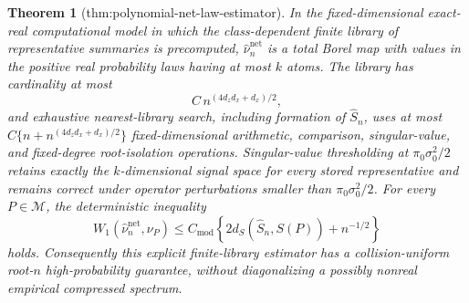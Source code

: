 \documentclass{article}
\newtheorem{theorem}{Theorem}
\begin{document}
\begin{theorem}[thm:polynomial-net-law-estimator]\label{thm:polynomial-net-law-estimator}
In the fixed-dimensional exact-real computational model in which the class-dependent finite library of representative summaries is precomputed, \(\widehat\nu_n^{\mathrm{net}}\) is a total Borel map with values in the positive real probability laws having at most \(k\) atoms.  The library has cardinality at most
\[
C\,n^{(4d_zd_x+d_x)/2},
\]
and exhaustive nearest-library search, including formation of \(\widehat S_n\), uses at most \(C\{n+n^{(4d_zd_x+d_x)/2}\}\) fixed-dimensional arithmetic, comparison, singular-value, and fixed-degree root-isolation operations.  Singular-value thresholding at \(\pi_0\sigma_0^2/2\) retains exactly the \(k\)-dimensional signal space for every stored representative and remains correct under operator perturbations smaller than \(\pi_0\sigma_0^2/2\).  For every \(P\in\mathcal M\), the deterministic inequality
\[
W_1(\widehat\nu_n^{\mathrm{net}},\nu_P)
\le C_{\mathrm{mod}}\left\{2d_S(\widehat S_n,S(P))+n^{-1/2}\right\}
\]
holds.  Consequently this explicit finite-library estimator has a collision-uniform root-\(n\) high-probability guarantee, without diagonalizing a possibly nonreal empirical compressed spectrum.
\end{theorem}
\end{document}
